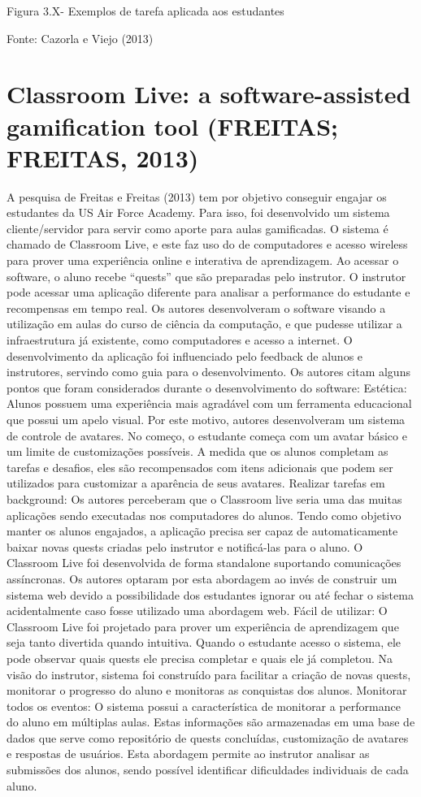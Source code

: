 \documentclass[
	12pt,				%
	oneside,			%
	a4paper,			%
	english,			%
	french,				%
	spanish,			%
	brazil,				%
	]{abntex2}
\begin{document}
Figura 3.X- Exemplos de tarefa aplicada aos estudantes

Fonte: Cazorla e Viejo  (2013)

\section{Classroom Live: a software-assisted gamification tool (FREITAS; FREITAS, 2013)}

	A pesquisa de Freitas e Freitas (2013) tem por objetivo conseguir engajar os estudantes da US Air Force Academy. Para isso, foi desenvolvido um sistema cliente/servidor para servir como aporte para aulas gamificadas. O sistema é chamado de Classroom Live, e este faz uso do de computadores e acesso wireless para prover uma experiência online e interativa de aprendizagem. Ao acessar o software, o aluno recebe “quests” que são preparadas pelo instrutor. O instrutor pode acessar uma aplicação diferente para analisar a performance do estudante e recompensas em tempo real.
	Os autores desenvolveram o software visando a utilização em aulas do curso de ciência da computação, e que pudesse utilizar a infraestrutura já existente, como computadores e acesso a internet. O desenvolvimento da aplicação foi influenciado pelo feedback de alunos e instrutores, servindo como guia para o desenvolvimento. Os autores citam alguns pontos que foram considerados durante o desenvolvimento do software:
Estética: Alunos possuem uma experiência mais agradável com um ferramenta educacional que possui um apelo visual. Por este motivo, autores desenvolveram um sistema de controle de avatares. No começo, o estudante começa com um avatar básico e um limite de customizações possíveis. A medida que os alunos completam as tarefas e desafios, eles são recompensados com itens adicionais que podem ser utilizados para customizar a aparência de seus avatares.
Realizar tarefas em background: Os autores perceberam que o Classroom live seria uma das muitas aplicações sendo executadas nos computadores do alunos. Tendo como objetivo manter os alunos engajados, a aplicação precisa ser capaz de automaticamente baixar novas quests criadas pelo instrutor e notificá-las para o aluno. O Classroom Live foi desenvolvida de forma standalone suportando comunicações assíncronas. Os autores optaram por esta abordagem ao invés de construir um sistema web devido a possibilidade dos estudantes ignorar ou até fechar o sistema acidentalmente caso fosse utilizado uma abordagem web.
Fácil de utilizar: O Classroom Live foi projetado para prover um experiência de aprendizagem que seja tanto divertida quando intuitiva. Quando o estudante acesso o sistema, ele pode observar quais quests ele precisa completar e quais ele já completou. Na visão do instrutor, sistema foi construído para facilitar a criação de novas quests, monitorar o progresso do aluno e monitoras as conquistas dos alunos.
Monitorar todos os eventos: O sistema possui a característica de monitorar a performance do aluno em múltiplas aulas. Estas informações são armazenadas em uma base de dados que serve como repositório de quests concluídas, customização de avatares e respostas de usuários. Esta abordagem permite ao instrutor analisar as submissões dos alunos, sendo possível identificar dificuldades individuais de cada aluno. 
\end{document}
